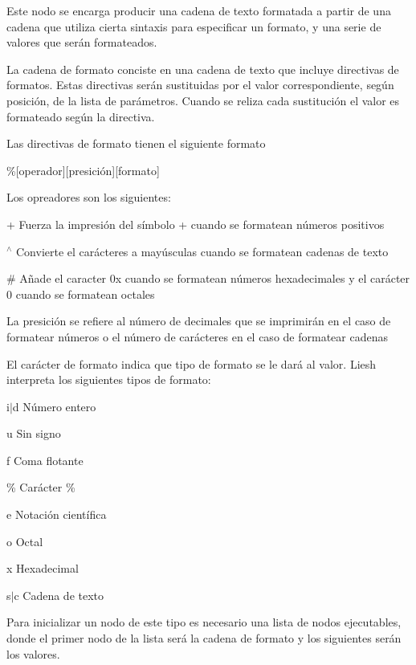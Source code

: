 Este nodo se encarga producir una cadena de texto formatada a partir de una cadena que utiliza cierta sintaxis para especificar un formato, y una serie de valores que serán formateados.

La cadena de formato conciste en una cadena de texto que incluye directivas de formatos. Estas directivas serán sustituidas por el valor correspondiente, según posición, de la lista de parámetros. Cuando se reliza cada sustitución el valor es formateado según la directiva.

Las directivas de formato tienen el siguiente formato

\%\mbox{[}operador\mbox{]}\mbox{[}presición\mbox{]}\mbox{[}formato\mbox{]}

Los opreadores son los siguientes\-:
\begin{DoxyItemize}
\item + Fuerza la impresión del símbolo + cuando se formatean números positivos
\item $^\wedge$ Convierte el carácteres a mayúsculas cuando se formatean cadenas de texto
\item \# Añade el caracter 0x cuando se formatean números hexadecimales y el carácter 0 cuando se formatean octales
\end{DoxyItemize}

La presición se refiere al número de decimales que se imprimirán en el caso de formatear números o el número de carácteres en el caso de formatear cadenas

El carácter de formato indica que tipo de formato se le dará al valor. Liesh interpreta los siguientes tipos de formato\-:
\begin{DoxyItemize}
\item i$\vert$d Número entero
\item u Sin signo
\item f Coma flotante
\item \% Carácter \%
\item e Notación científica
\item o Octal
\item x Hexadecimal
\item s$\vert$c Cadena de texto
\end{DoxyItemize}

Para inicializar un nodo de este tipo es necesario una lista de nodos ejecutables, donde el primer nodo de la lista será la cadena de formato y los siguientes serán los valores. 

